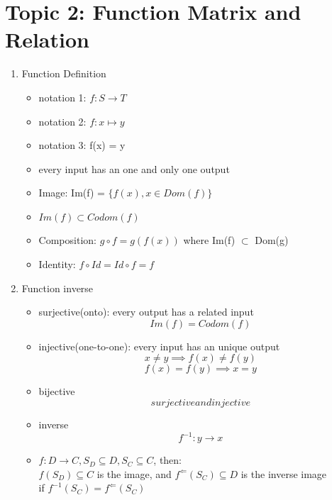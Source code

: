 \documentclass[11pt, a4paper]{article}
\begin{document}
\section*{Topic 2: Function Matrix and Relation}
    \begin{enumerate}
        \item Function Definition
            \begin{itemize}
                \item notation 1: $f: S \rightarrow T$
                \item notation 2: $f: x \mapsto y$
                \item notation 3: f(x) = y
                \item every input has an one and only one output
                \item Image: Im(f) = $\{f(x), x \in Dom(f)\}$
                \item $Im(f) \subset Codom(f)$
                \item Composition: $g \circ f = g(f(x))$ where Im(f) $\subset$ Dom(g)
                \item Identity: $f \circ Id = Id \circ f = f$
            \end{itemize}
        \item Function inverse
            \begin{itemize}
                \item surjective(onto): every output has a related input\\
                    $$Im(f) = Codom(f)$$
                \item injective(one-to-one): every input has an unique output\\
                    $$x \ne y \implies f(x) \ne f(y)$$
                    $$f(x) = f(y) \implies x = y$$
                \item bijective\\
                    $$surjective and injective$$
                \item inverse\\
                    $$f^{-1}: y \rightarrow x$$
                \item $f: D \rightarrow C, S_D \subseteq D, S_C \subseteq C$, then:\\
                    $f(S_D) \subseteq C$ is the image, and $f^{\Leftarrow}(S_C) \subseteq D$ is the inverse image\\
                    if $f^{-1}(S_C) = f^{\Leftarrow}(S_C)$
            \end{itemize}

\end{enumerate}
\end{document}
